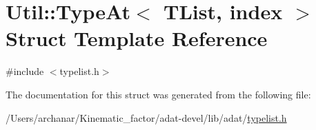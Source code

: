 \hypertarget{structUtil_1_1TL_1_1TypeAt}{}\section{Util\+:\+:Type\+At$<$ T\+List, index $>$ Struct Template Reference}
\label{structUtil_1_1TL_1_1TypeAt}


{\ttfamily \#include $<$typelist.\+h$>$}



The documentation for this struct was generated from the following file\+:\begin{DoxyCompactItemize}
\item 
/\+Users/archanar/\+Kinematic\+\_\+factor/adat-\/devel/lib/adat/\mbox{\hyperlink{adat-devel_2lib_2adat_2typelist_8h}{typelist.\+h}}\end{DoxyCompactItemize}
